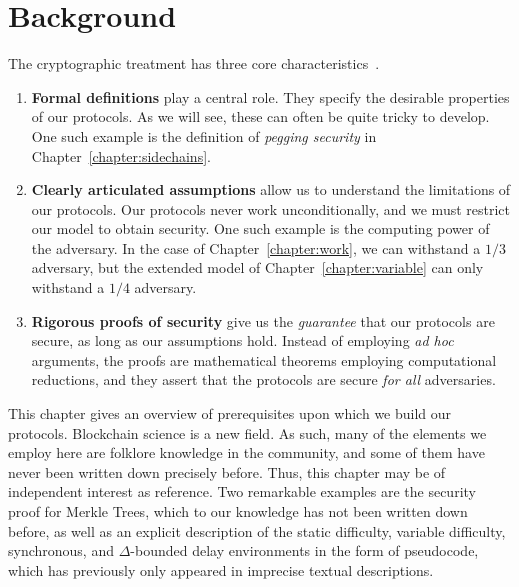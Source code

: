 \chapter{Background}\label{chapter:background}

The cryptographic treatment has three core characteristics~\cite{katz}.

\begin{enumerate}
  \item \textbf{Formal definitions} play a central role. They specify the
        desirable properties of our protocols. As we will see, these can often
        be quite tricky to develop. One such example is the definition of
        \emph{pegging security} in Chapter~\ref{chapter:sidechains}.
  \item \textbf{Clearly articulated assumptions} allow us to understand the
        limitations of our protocols. Our protocols never work
        unconditionally, and we must restrict our model to obtain security. One
        such example is the computing power of the adversary. In the case of
        Chapter~\ref{chapter:work}, we can withstand a $1/3$ adversary, but the
        extended model of Chapter~\ref{chapter:variable} can only withstand a
        $1/4$ adversary.
  \item \textbf{Rigorous proofs of security} give us the \emph{guarantee} that
        our protocols are secure, as long as our assumptions hold. Instead of
        employing \emph{ad hoc} arguments, the proofs are mathematical theorems
        employing computational reductions, and they assert that the protocols
        are secure \emph{for all} adversaries.
\end{enumerate}

This chapter gives an overview of prerequisites upon which we build our
protocols. Blockchain science is a new field. As such, many of the elements we
employ here are folklore knowledge in the community, and some of them have never
been written down precisely before. Thus, this chapter may be of independent
interest as reference. Two remarkable examples are the security proof for
Merkle Trees, which to our knowledge has not been written down before, as well
as an explicit description of the static difficulty, variable difficulty,
synchronous, and $\Delta$-bounded delay environments in the form of pseudocode,
which has previously only appeared in imprecise textual descriptions.





